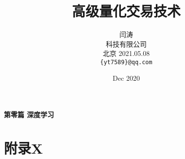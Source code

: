 \documentclass[UTF8]{ctexart}
\title{高级量化交易技术}
\author{
  闫涛 \\
  科技有限公司\\
  北京 2021.05.08\\
  \texttt{\{yt7589\}@qq.com} \\
}
\date{Dec 2020}
\begin{document}
\newpage
\maketitle
\begin{center}
\quad \newline \quad \newline \quad \newline \quad \newline \quad \newline \quad \newline \quad \newline \quad \newline \quad \newline \quad \newline
\quad \newline \quad \newline \quad \newline \quad \newline \quad \newline \quad \newline \quad \newline \quad \newline \quad \newline \quad \newline
\quad \newline \quad \newline \quad \newline \quad \newline \quad \newline \quad \newline \quad \newline \quad \newline \quad \newline \quad \newline
\quad \newline \quad \newline \quad \newline
\Large \textbf{第零篇 深度学习} \quad \textbf{}
\end{center}





\section{附录X}

\newpage




\appendix
\end{document}
